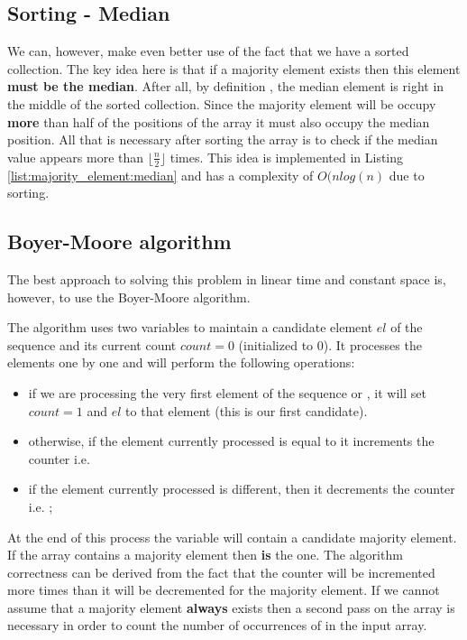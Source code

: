 \subsection{Sorting - Median}
\label{majority_element:sec:median}
We can, however, make even better use of the fact that we have a sorted collection. The key idea here is that if a majority element exists then this element \textbf{must be the median}. After all, by definition , the median element is right in the middle of the sorted collection. Since the majority element will be occupy \textbf{more} than half of the  positions of the array it must also occupy the median position.
All that is necessary after sorting the array is to check if the median value appears more than $\lfloor \frac{n}{2} \rfloor$ times. 
This idea is implemented in Listing \ref{list:majority_element:median} and has a complexity of $O(nlog(n)$ due to sorting.



\subsection{Boyer-Moore algorithm}
\label{majority_element:sec:linear}
The best approach to solving this problem in linear time and constant space is, however,  to use the Boyer-Moore algorithm\cite{Boyer1991}.

The algorithm uses two variables to maintain a candidate element $el$ of the sequence and its current count $count=0$ (initialized to $0$). It processes the elements one by one and will perform the following operations:
\begin{itemize}
	\item if we are processing the very first element  of the sequence or , it will set $count=1$ and $el$ to that element (this is our first candidate).
	\item otherwise, if the element currently processed is equal to it increments the counter i.e. 
	\item if the element currently processed is different, then it decrements the counter i.e. ;
\end{itemize}


At the end of this process the variable  will contain a candidate majority element. If the array contains a majority element then  \textbf{is} the one. The algorithm correctness can be derived from the fact that the counter will be incremented more times than it will be decremented for the majority element. If we cannot assume that a majority element \textbf{always} exists then a second pass  on the array is necessary in order to count the number of occurrences of  in the input array.

